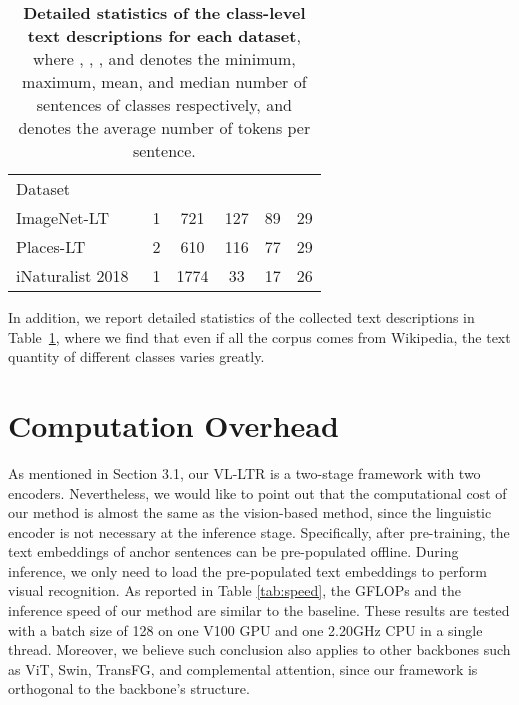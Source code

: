 \documentclass[runningheads]{llncs}
\newlength\savedwidth
\newcommand\whline{\noalign{\global\savedwidth\arrayrulewidth\global\arrayrulewidth 0.8pt}\hline\noalign{\global\arrayrulewidth\savedwidth}}
\begin{document}
\begin{table}[h]
    \centering
    \setlength{\tabcolsep}{3mm}
    \caption{\textbf{Detailed statistics of the class-level text descriptions for each dataset}, where , , , and  denotes the minimum, maximum, mean, and median number of sentences of classes respectively, and  denotes the average number of tokens per sentence.}
    \begin{tabular}{l|c|c|c|c|c}


Dataset          &  &  &  &  &  \\ \whline
ImageNet-LT~\cite{liu2019large}     &   1  &  721   &   127   &   89  &  29          \\
Places-LT~\cite{liu2019large}        &   2  &  610   &    116  &  77   &  29          \\
iNaturalist 2018~\cite{van2018inaturalist} &   1  &  1774  &   33    &  17   &  26          \\ 
\end{tabular}     \label{tab:text_stats}
\end{table}

In addition, we report detailed statistics of the collected text descriptions in Table~\ref{tab:text_stats}, where we find that even if all the corpus comes from Wikipedia, the text quantity of different classes varies greatly.



\section{Computation Overhead}

As mentioned in Section 3.1, our VL-LTR is a two-stage framework with two encoders.
Nevertheless, we would like to point out that the computational cost of our method is almost the same as the vision-based method, 
since the linguistic encoder is not necessary at the inference stage.
Specifically, after pre-training, the text embeddings of anchor sentences can be pre-populated offline.
During inference, we only need to load the pre-populated text embeddings to perform visual recognition.
As reported in Table \ref{tab:speed}, the GFLOPs and the inference speed of our method are similar to the baseline.
These results are tested with a batch size of 128 on one V100 GPU and one 2.20GHz CPU in a single thread. 
Moreover, we believe such conclusion also applies to other backbones such as ViT, Swin, TransFG, and complemental attention, since our framework is orthogonal to the backbone's structure.
\end{document}
